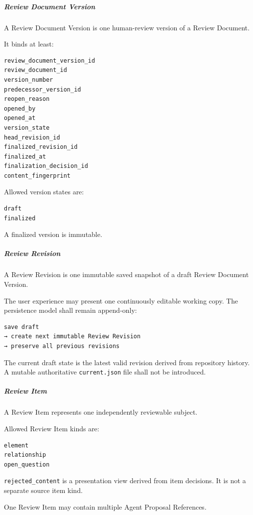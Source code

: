 \hypertarget{review-document-version}{%
\subparagraph{Review Document Version}\label{review-document-version}}

A Review Document Version is one human-review version of a Review Document.

It binds at least:

\begin{verbatim}
review_document_version_id
review_document_id
version_number
predecessor_version_id
reopen_reason
opened_by
opened_at
version_state
head_revision_id
finalized_revision_id
finalized_at
finalization_decision_id
content_fingerprint
\end{verbatim}

Allowed version states are:

\begin{verbatim}
draft
finalized
\end{verbatim}

A finalized version is immutable.

\hypertarget{review-revision}{%
\subparagraph{Review Revision}\label{review-revision}}

A Review Revision is one immutable saved snapshot of a draft Review Document Version.

The user experience may present one continuously editable working copy. The persistence model shall remain append-only:

\begin{verbatim}
save draft
→ create next immutable Review Revision
→ preserve all previous revisions
\end{verbatim}

The current draft state is the latest valid revision derived from repository history. A mutable authoritative \texttt{current.json} file shall not be introduced.

\hypertarget{review-item}{%
\subparagraph{Review Item}\label{review-item}}

A Review Item represents one independently reviewable subject.

Allowed Review Item kinds are:

\begin{verbatim}
element
relationship
open_question
\end{verbatim}

\texttt{rejected\_content} is a presentation view derived from item decisions. It is not a separate source item kind.

One Review Item may contain multiple Agent Proposal References.

